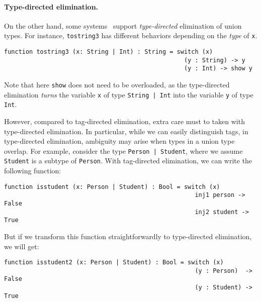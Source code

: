 \paragraph{Type-directed elimination.}

On the other hand, some
systems~\cite{castagna:settheoretic} support
\textit{type-directed} elimination of union types. For instance,
\lstinline{tostring3} has different behaviors depending on the \textit{type} of
\lstinline{x}.

\begin{lstlisting}
function tostring3 (x: String | Int) : String = switch (x)
                                                  (y : String) -> y
                                                  (y : Int) -> show y
\end{lstlisting}

\noindent Note that here \lstinline{show} does not need to be overloaded,
as the type-directed elimination
\textit{turns} the variable \lstinline{x} of type \lstinline{String | Int} into
the variable \lstinline{y} of type \lstinline{Int}.

However, compared to tag-directed elimination, extra care must to taken with
type-directed elimination. In particular, while we can easily distinguish tags,
in type-directed elimination, ambiguity may arise when types in a union type
overlap. For example, consider the type \lstinline{Person | Student}, where we
assume \lstinline{Student} is a subtype of \lstinline{Person}. With tag-directed
elimination, we can write the following function:

\begin{lstlisting}
function isstudent (x: Person | Student) : Bool = switch (x)
                                                     inj1 person -> False
                                                     inj2 student -> True
\end{lstlisting}

\noindent But if we transform this function straightforwardly to type-directed
elimination, we will get:

\begin{lstlisting}
function isstudent2 (x: Person | Student) : Bool = switch (x)
                                                     (y : Person)  -> False
                                                     (y : Student) -> True
\end{lstlisting}


